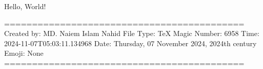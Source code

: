 Hello, World!

===========================================
Created by: MD. Naiem Islam Nahid
File Type: TeX
Magic Number: 6958
Time: 2024-11-07T05:03:11.134968
Date: Thursday, 07 November 2024, 2024th century
Emoji: None
===========================================
